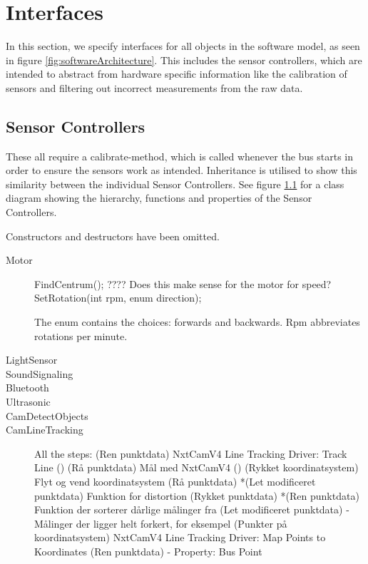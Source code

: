 \section{Interfaces}
In this section, we specify interfaces for all objects in the software model, as seen in figure \ref{fig:softwareArchitecture}. This includes the sensor controllers, which are intended to abstract from hardware specific information like the calibration of sensors and filtering out incorrect measurements from the raw data. 

\subsection{Sensor Controllers}
These all require a calibrate-method, which is called whenever the bus starts in order to ensure the sensors work as intended. Inheritance is utilised to show this similarity between the individual Sensor Controllers. See figure \ref{} for a class diagram showing the hierarchy, functions and properties of the Sensor Controllers. 

Constructors and destructors have been omitted.

\begin{description}
    \item [Motor]
    FindCentrum(); ???? Does this make sense for the motor for speed?
    SetRotation(int rpm, enum direction);
    
    
    The enum contains the choices: forwards and backwards. Rpm abbreviates rotations per minute.
    
    \item [LightSensor]
    \item [SoundSignaling]
    \item [Bluetooth]
    \item [Ultrasonic]
    \item [CamDetectObjects]
    \item [CamLineTracking]
    All the steps:
    (Ren punktdata) NxtCamV4 Line Tracking Driver: Track Line ()
	(Rå punktdata) Mål med NxtCamV4 ()
	(Rykket koordinatsystem) Flyt og vend koordinatsystem (Rå punktdata)
	*(Let modificeret punktdata) Funktion for distortion (Rykket punktdata)
	*(Ren punktdata) Funktion der sorterer dårlige målinger fra (Let modificeret punktdata)			- Målinger der ligger helt forkert, for eksempel
	(Punkter på koordinatsystem) NxtCamV4 Line Tracking Driver: Map Points to Koordinates (Ren punktdata)
	- Property: Bus Point

    
\end{description}


